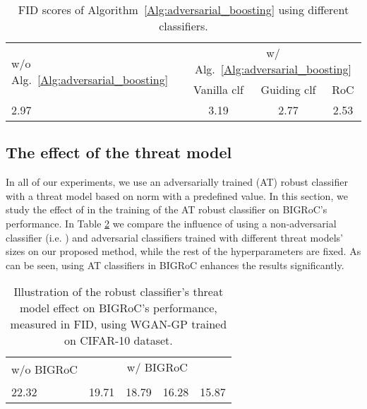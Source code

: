 \documentclass[10pt]{article} \usepackage[accepted]{tmlr}
\begin{document}
\begin{table}[ht]
\caption{FID scores of Algorithm~\ref{Alg:adversarial_boosting} using different classifiers.}
\begin{center}
\begin{small}
\begin{sc}
\begin{tabular}{lccc}
\toprule
\multirow{2}{*}{w/o Alg.~\ref{Alg:adversarial_boosting}} & \multicolumn{3}{c}{w/ Alg.~\ref{Alg:adversarial_boosting}} \\
& Vanilla clf & Guiding clf & RoC\\
\midrule
2.97 & 3.19 & 2.77 & 2.53 \\
\bottomrule
\end{tabular}
\end{sc}
\end{small}
\end{center}
\label{tab:guiding_clf_ablataion}
\end{table}

\subsection{The effect of the threat model}
In all of our experiments, we use an adversarially trained (AT) robust classifier with a threat model  based on  norm with a predefined  value. In this section, we study the effect of  in the training of the AT robust classifier on BIGRoC's performance. In Table \ref{tab:ablation_threat_model} we compare the influence of using a non-adversarial classifier (i.e. ) and adversarial classifiers trained with different threat models' sizes on our proposed method, while the rest of the hyperparameters are fixed.
As can be seen, using AT classifiers in BIGRoC enhances the results significantly.

\begin{table}[ht]
\caption{Illustration of the robust classifier's threat model effect on BIGRoC's performance, measured in FID, using WGAN-GP trained on CIFAR-10 dataset.}
\begin{center}
\begin{small}
\begin{sc}
\begin{tabular}{lcccc}
\toprule
\multirow{2}{*}{w/o BIGRoC} & \multicolumn{4}{c}{w/ BIGRoC} \\
&  &  & & \\
\midrule
22.32 & 19.71 & 18.79 & 16.28 & 15.87 \\
\bottomrule
\end{tabular}
\end{sc}
\end{small}
\end{center}
\label{tab:ablation_threat_model}
\end{table}
\end{document}
